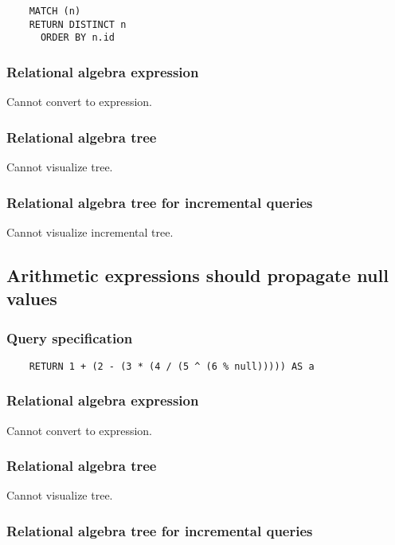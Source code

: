 	\begin{lstlisting}
	MATCH (n)
	RETURN DISTINCT n
	  ORDER BY n.id
	\end{lstlisting}


	\subsubsection*{Relational algebra expression}

	Cannot convert to expression.

	\subsubsection*{Relational algebra tree}

	Cannot visualize tree.

	\subsubsection*{Relational algebra tree for incremental queries}

	Cannot visualize incremental tree.
	\subsection{Arithmetic expressions should propagate null values}

	\subsubsection*{Query specification}

	\begin{lstlisting}
	RETURN 1 + (2 - (3 * (4 / (5 ^ (6 % null))))) AS a
	\end{lstlisting}


	\subsubsection*{Relational algebra expression}

	Cannot convert to expression.

	\subsubsection*{Relational algebra tree}

	Cannot visualize tree.

	\subsubsection*{Relational algebra tree for incremental queries}

